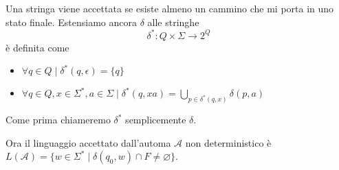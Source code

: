 \documentclass[12pt]{article}
\begin{document}
Una stringa viene accettata se esiste almeno un cammino che mi porta in uno stato finale.
Estensiamo ancora $\delta$ alle stringhe 
$$ \delta^* : Q \times \Sigma \rightarrow 2^Q $$
è definita come
\begin{itemize}
	\item $\forall q \in Q \mid \delta^*(q, \epsilon) = \{ q \} $
	\item $\forall q \in Q, x \in \Sigma^*, a \in \Sigma \mid \delta^*(q, xa) = \bigcup_{p \in \delta^*(q, x)} \delta(p, a) $
\end{itemize}

Come prima chiameremo $\delta^*$ semplicemente $\delta$.

Ora il linguaggio accettato dall'automa $\mathscr{A}$ non deterministico è $L(\mathscr{A}) = \{ w \in \Sigma^* \mid \delta(q_0, w) \cap F \neq \varnothing \}$.
\end{document}
